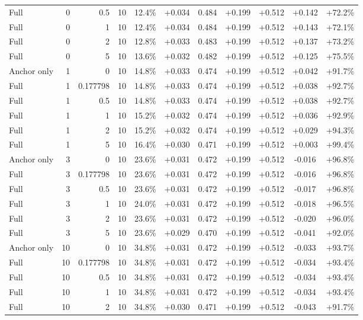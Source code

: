 \begin{table}[htbp]
\begin{tabular}{lrrrccccccc}
Full & 0 & 0.5 & 10 & 12.4\% & +0.034 & 0.484 & +0.199 & +0.512 & +0.142 & +72.2\% \\
Full & 0 & 1 & 10 & 12.4\% & +0.034 & 0.484 & +0.199 & +0.512 & +0.143 & +72.1\% \\
Full & 0 & 2 & 10 & 12.8\% & +0.033 & 0.483 & +0.199 & +0.512 & +0.137 & +73.2\% \\
Full & 0 & 5 & 10 & 13.6\% & +0.032 & 0.482 & +0.199 & +0.512 & +0.125 & +75.5\% \\
Anchor only & 1 & 0 & 10 & 14.8\% & +0.033 & 0.474 & +0.199 & +0.512 & +0.042 & +91.7\% \\
Full & 1 & 0.177798 & 10 & 14.8\% & +0.033 & 0.474 & +0.199 & +0.512 & +0.038 & +92.7\% \\
Full & 1 & 0.5 & 10 & 14.8\% & +0.033 & 0.474 & +0.199 & +0.512 & +0.038 & +92.7\% \\
Full & 1 & 1 & 10 & 15.2\% & +0.032 & 0.474 & +0.199 & +0.512 & +0.036 & +92.9\% \\
Full & 1 & 2 & 10 & 15.2\% & +0.032 & 0.474 & +0.199 & +0.512 & +0.029 & +94.3\% \\
Full & 1 & 5 & 10 & 16.4\% & +0.030 & 0.471 & +0.199 & +0.512 & +0.003 & +99.4\% \\
Anchor only & 3 & 0 & 10 & 23.6\% & +0.031 & 0.472 & +0.199 & +0.512 & -0.016 & +96.8\% \\
Full & 3 & 0.177798 & 10 & 23.6\% & +0.031 & 0.472 & +0.199 & +0.512 & -0.016 & +96.8\% \\
Full & 3 & 0.5 & 10 & 23.6\% & +0.031 & 0.472 & +0.199 & +0.512 & -0.017 & +96.8\% \\
Full & 3 & 1 & 10 & 24.0\% & +0.031 & 0.472 & +0.199 & +0.512 & -0.018 & +96.5\% \\
Full & 3 & 2 & 10 & 23.6\% & +0.031 & 0.472 & +0.199 & +0.512 & -0.020 & +96.0\% \\
Full & 3 & 5 & 10 & 23.6\% & +0.029 & 0.470 & +0.199 & +0.512 & -0.041 & +92.0\% \\
Anchor only & 10 & 0 & 10 & 34.8\% & +0.031 & 0.472 & +0.199 & +0.512 & -0.033 & +93.7\% \\
Full & 10 & 0.177798 & 10 & 34.8\% & +0.031 & 0.472 & +0.199 & +0.512 & -0.034 & +93.4\% \\
Full & 10 & 0.5 & 10 & 34.8\% & +0.031 & 0.472 & +0.199 & +0.512 & -0.034 & +93.4\% \\
Full & 10 & 1 & 10 & 34.8\% & +0.031 & 0.472 & +0.199 & +0.512 & -0.034 & +93.4\% \\
Full & 10 & 2 & 10 & 34.8\% & +0.030 & 0.471 & +0.199 & +0.512 & -0.043 & +91.7\% \\

\end{tabular}
\end{table}
